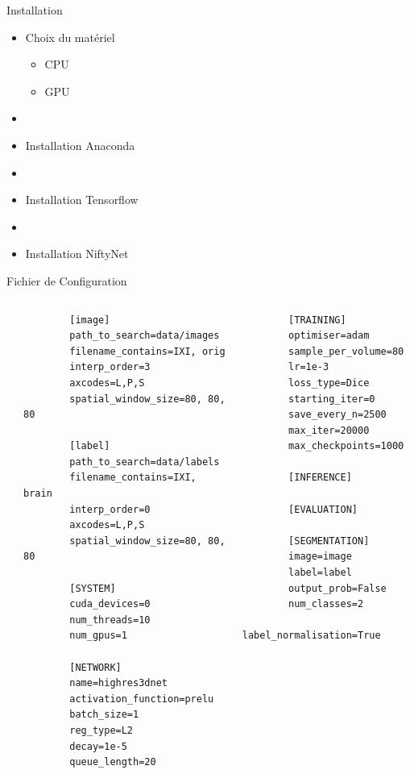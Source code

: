 \documentclass{beamer}
\begin{document}
\begin{frame}{Installation}
  \begin{itemize}
    \item Choix du matériel
    \begin{itemize}
      \item CPU
      \item GPU
    \end{itemize}
    \item[]
    \item Installation Anaconda
    \item[]
    \item Installation Tensorflow
    \item[]
    \item Installation NiftyNet
  \end{itemize}
\end{frame}

\begin{frame}[fragile]{Fichier de Configuration}
  \tiny
  \begin{columns}
    \begin{column}{0.01\textwidth}

    \end{column}
    \begin{column}{0.5\textwidth}
      \begin{verbatim}
        [image]
        path_to_search=data/images
        filename_contains=IXI, orig
        interp_order=3
        axcodes=L,P,S
        spatial_window_size=80, 80, 80

        [label]
        path_to_search=data/labels
        filename_contains=IXI, brain
        interp_order=0
        axcodes=L,P,S
        spatial_window_size=80, 80, 80

        [SYSTEM]
        cuda_devices=0
        num_threads=10
        num_gpus=1

        [NETWORK]
        name=highres3dnet
        activation_function=prelu
        batch_size=1
        reg_type=L2
        decay=1e-5
        queue_length=20
      \end{verbatim}
    \end{column}
    \begin{column}{0.5\textwidth}
      \begin{verbatim}
        [TRAINING]
        optimiser=adam
        sample_per_volume=80
        lr=1e-3
        loss_type=Dice
        starting_iter=0
        save_every_n=2500
        max_iter=20000
        max_checkpoints=1000

        [INFERENCE]

        [EVALUATION]

        [SEGMENTATION]
        image=image
        label=label
        output_prob=False
        num_classes=2
        label_normalisation=True
      \end{verbatim}
    \end{column}
  \end{columns}
\end{frame}
\end{document}
